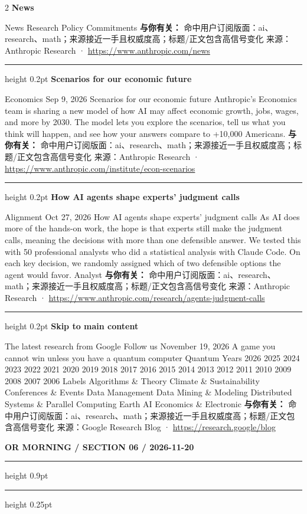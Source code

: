 \documentclass[10.5pt]{ctexart}
\begin{document}
\begin{multicols}{2}
{\large\bfseries News}\par
News Research Policy Commitments
\textbf{与你有关：} 命中用户订阅版面：ai、research、math；来源接近一手且权威度高；标题/正文包含高信号变化
{\footnotesize\color{ormuted} 来源：Anthropic Research · \url{https://www.anthropic.com/news}}
\vspace{2mm}
\hrule height 0.2pt
\vspace{2mm}
{\large\bfseries Scenarios for our economic future}\par
Economics Sep 9, 2026 Scenarios for our economic future Anthropic’s Economics team is sharing a new model of how AI may affect economic growth, jobs, wages, and more by 2030. The model lets you explore the scenarios, tell us what you think will happen, and see how your answers compare to +10,000 Americans.
\textbf{与你有关：} 命中用户订阅版面：ai、research、math；来源接近一手且权威度高；标题/正文包含高信号变化
{\footnotesize\color{ormuted} 来源：Anthropic Research · \url{https://www.anthropic.com/institute/econ-scenarios}}
\vspace{2mm}
\hrule height 0.2pt
\vspace{2mm}
{\large\bfseries How AI agents shape experts’ judgment calls}\par
Alignment Oct 27, 2026 How AI agents shape experts’ judgment calls As AI does more of the hands-on work, the hope is that experts still make the judgment calls, meaning the decisions with more than one defensible answer. We tested this with 50 professional analysts who did a statistical analysis with Claude Code. On each key decision, we randomly assigned which of two defensible options the agent would favor. Analyst
\textbf{与你有关：} 命中用户订阅版面：ai、research、math；来源接近一手且权威度高；标题/正文包含高信号变化
{\footnotesize\color{ormuted} 来源：Anthropic Research · \url{https://www.anthropic.com/research/agents-judgment-calls}}
\vspace{2mm}
\hrule height 0.2pt
\vspace{2mm}
{\large\bfseries Skip to main content}\par
The latest research from Google Follow us November 19, 2026 A game you cannot win unless you have a quantum computer Quantum Years 2026 2025 2024 2023 2022 2021 2020 2019 2018 2017 2016 2015 2014 2013 2012 2011 2010 2009 2008 2007 2006 Labels Algorithms \& Theory Climate \& Sustainability Conferences \& Events Data Management Data Mining \& Modeling Distributed Systems \& Parallel Computing Earth AI Economics \& Electronic
\textbf{与你有关：} 命中用户订阅版面：ai、research、math；来源接近一手且权威度高；标题/正文包含高信号变化
{\footnotesize\color{ormuted} 来源：Google Research Blog · \url{https://research.google/blog}}
\end{multicols}
\newpage
{\small\bfseries OR MORNING / SECTION 06 / 2026-11-20}
\vspace{2mm}
\hrule height 0.9pt
\vspace{1.5mm}
\hrule height 0.25pt
\vspace{4mm}
\end{document}
